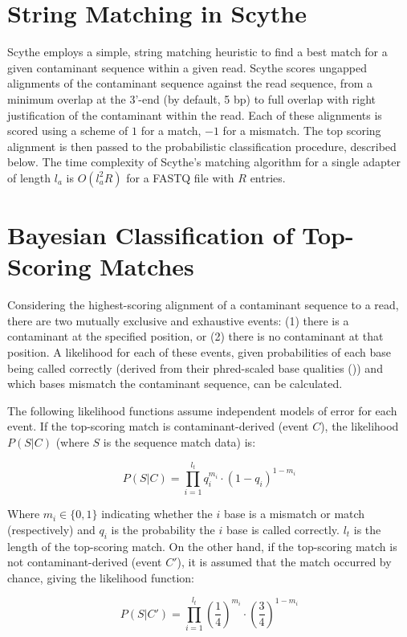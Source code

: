 \documentclass{bioinfo}
\begin{document}
\begin{methods}
\section{String Matching in Scythe}

Scythe employs a simple, string matching heuristic to find a best
match for a given contaminant sequence within a given read. Scythe
scores ungapped alignments of the contaminant sequence against the
read sequence, from a minimum overlap at the 3'-end (by default, 5 bp)
to full overlap with right justification of the contaminant within the
read. Each of these alignments is scored using a scheme of $1$ for a
match, $-1$ for a mismatch. The top scoring alignment is then passed
to the probabilistic classification procedure, described below. The
time complexity of Scythe's matching algorithm for a single adapter of
length $l_a$ is $O(l_a^2 R)$ for a FASTQ file with $R$ entries.


\section{Bayesian Classification of Top-Scoring Matches}

Considering the highest-scoring alignment of a contaminant sequence to
a read, there are two mutually exclusive and exhaustive events: (1)
there is a contaminant at the specified position, or (2) there is no
contaminant at that position. A likelihood for each of these events,
given probabilities of each base being called correctly (derived from
their phred-scaled base qualities (\citealp{ewing1998})) and which
bases mismatch the contaminant sequence, can be calculated.

The following likelihood functions assume independent models of error
for each event. If the top-scoring match is contaminant-derived (event
$C$), the likelihood $P(S | C)$ (where $S$ is the sequence match data)
is:

$$ P(S | C) = \prod_{i=1}^{l_t} q_i^{m_i} \cdot (1-q_i)^{1 - m_i} $$

Where $m_i \in \{0, 1\}$ indicating whether the $i$ base is a mismatch
or match (respectively) and $q_i$ is the probability the $i$ base is
called correctly. $l_t$ is the length of the top-scoring match. On the
other hand, if the top-scoring match is not contaminant-derived (event
$C'$), it is assumed that the match occurred by chance, giving the
likelihood function:

$$ P(S | C') = \prod_{i=1}^{l_t} \left(\frac{1}{4}\right)^{m_i} \cdot \left(\frac{3}{4}\right)^{1 - m_i} $$


\end{methods}
\end{document}
